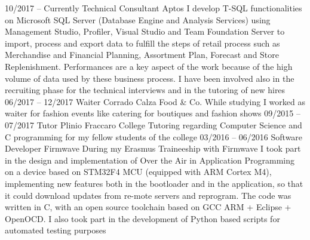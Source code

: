 \documentclass[9pt]{developercv} %
\begin{document}
\begin{entrylist}
	\entry
		{10/2017 -- Currently}
		{Technical Consultant}
		{Aptos}
		{I develop T-SQL functionalities on Microsoft SQL Server (Database Engine and Analysis Services) using Management Studio, Profiler, Visual Studio and Team Foundation Server to import, process and export data to fulfill the steps of retail process such as Merchandise and Financial Planning, Assortment Plan, Forecast and Store Replenishment. Performances are a key aspect of the work because of the high volume of data used by these business process. I have been involved also in the recruiting phase for the technical interviews and in the tutoring of new hires}
		{}
		{}
	\entry
		{06/2017 -- 12/2017}
		{Waiter}
		{Corrado Calza Food \& Co.}
		{While studying I worked as waiter for fashion events like catering for boutiques and fashion shows}
		{}
		{}
	\entry
		{09/2015 -- 07/2017}
		{Tutor}
		{Plinio Fraccaro College}
		{Tutoring regarding Computer Science and C programming for my fellow students of the college}
		{}
		{}
	\entry
		{03/2016 -- 06/2016}
		{Software Developer}
		{Firmwave}
		{During my Erasmus Traineeship with Firmwave I took part in the design and implementation of Over the Air in Application Programming on a device based on STM32F4 MCU (equipped with ARM Cortex M4), implementing new features both in the bootloader and in the application, so that it could download updates from re-mote servers and reprogram. The code was written in C, with an open source toolchain based on GCC ARM + Eclipse + OpenOCD. I also took part in the development of Python based scripts for automated testing purposes}
		{}
		{}
\end{entrylist}


\end{document}
